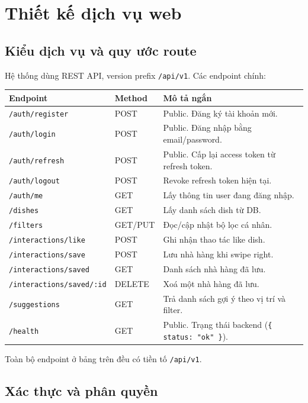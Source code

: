 \section{Thiết kế dịch vụ web}

\subsection{Kiểu dịch vụ và quy ước route}

Hệ thống dùng REST API, version prefix \texttt{/api/v1}. Các endpoint chính:

\begin{center}
\begin{tabular}{p{5.5cm} p{1.6cm} p{6.5cm}}
\toprule
\textbf{Endpoint} & \textbf{Method} & \textbf{Mô tả ngắn} \\
\midrule
\texttt{/auth/register} & POST & Public. Đăng ký tài khoản mới. \\
\texttt{/auth/login} & POST & Public. Đăng nhập bằng email/password. \\
\texttt{/auth/refresh} & POST & Public. Cấp lại access token từ refresh token. \\
\texttt{/auth/logout} & POST & Revoke refresh token hiện tại. \\
\texttt{/auth/me} & GET & Lấy thông tin user đang đăng nhập. \\
\texttt{/dishes} & GET & Lấy danh sách dish từ DB. \\
\texttt{/filters} & GET/PUT & Đọc/cập nhật bộ lọc cá nhân. \\
\texttt{/interactions/like} & POST & Ghi nhận thao tác like dish. \\
\texttt{/interactions/save} & POST & Lưu nhà hàng khi swipe right. \\
\texttt{/interactions/saved} & GET & Danh sách nhà hàng đã lưu. \\
\texttt{/interactions/saved/:id} & DELETE & Xoá một nhà hàng đã lưu. \\
\texttt{/suggestions} & GET & Trả danh sách gợi ý theo vị trí và filter. \\
\texttt{/health} & GET & Public. Trạng thái backend (\texttt{\{ status: "ok" \}}). \\
\bottomrule
\end{tabular}
\end{center}

Toàn bộ endpoint ở bảng trên đều có tiền tố \texttt{/api/v1}.

\subsection{Xác thực và phân quyền}

